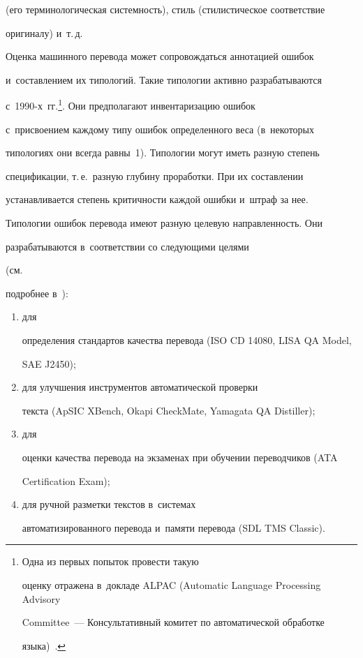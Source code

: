 (его терминологическая системность), стиль (стилистическое соответствие 

оригиналу) и~т.\,д.

  

  Оценка машинного перевода может сопровождаться аннотацией ошибок 

и~составлением их типологий. Такие типологии активно разрабатываются 

с~\mbox{1990-х}~гг.\footnote[3]{Одна из первых попыток провести такую 

оценку отражена в~докладе ALPAC (Automatic Language Processing Advisory 

Committee~--- Консультативный комитет по автоматической обработке 

языка)~\cite{15-r}.}. Они предполагают инвентаризацию ошибок 

с~присвоением каждому типу ошибок определенного веса (в~некоторых 

типологиях они всегда равны~1). Типологии могут иметь разную степень 

спецификации, т.\,е.\ разную глубину проработки. При их составлении 

устанавливается степень критичности каждой ошибки и~штраф за нее.

  

  Типологии ошибок перевода имеют разную целевую направленность. Они 

разрабатываются в~соответствии со следующими целями

 (см.\ 

подробнее в~\cite{16-r}):

\begin{enumerate}[(1)]

\item для 

определения стандартов качества перевода (ISO CD 14080, LISA QA Model, 

SAE J2450);\\[-14pt] 

\item для улучшения инструментов автоматической проверки 

текста (ApSIC XBench, Okapi CheckMate, Yamagata QA Distiller);\\[-14pt]

\item для 

оценки качества перевода на экзаменах при обучении переводчиков (ATA 

Certification Exam);\\[-14pt]

\item для ручной разметки текстов в~системах 

автоматизированного перевода и~памяти перевода (SDL TMS Classic). 

\end{enumerate}

